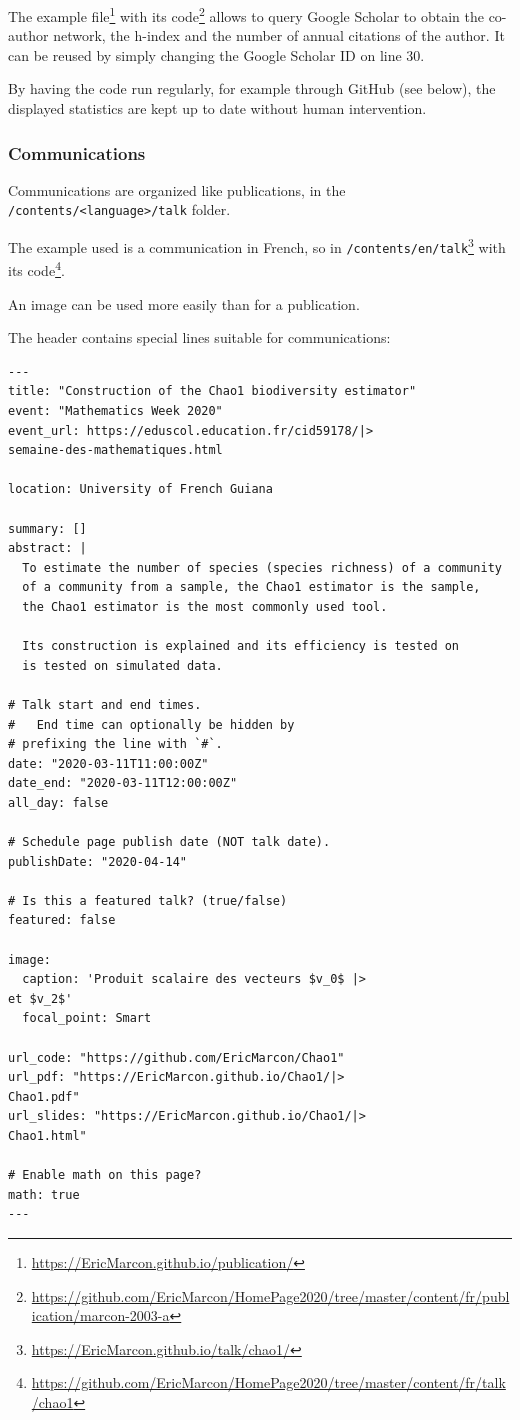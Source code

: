 \documentclass[
  12pt,
  american,
  a4paper,
  extrafontsizes,onecolumn,openright
  ]{memoir}
\begin{document}
The example file\footnote{\url{https://EricMarcon.github.io/publication/}} with its code\footnote{\url{https://github.com/EricMarcon/HomePage2020/tree/master/content/fr/publication/marcon-2003-a}} allows to query Google Scholar to obtain the co-author network, the h-index and the number of annual citations of the author.
It can be reused by simply changing the Google Scholar ID on line 30.

By having the code run regularly, for example through GitHub (see below), the displayed statistics are kept up to date without human intervention.

\subsubsection{Communications}\label{communications}

Communications are organized like publications, in the \texttt{/contents/\textless{}language\textgreater{}}\break\texttt{/talk} folder.

The example used is a communication in French, so in \texttt{/contents/en/talk}\footnote{\url{https://EricMarcon.github.io/talk/chao1/}} with its code\footnote{\url{https://github.com/EricMarcon/HomePage2020/tree/master/content/fr/talk/chao1}}.

An image can be used more easily than for a publication.

The header contains special lines suitable for communications:

\begin{verbatim}
---
title: "Construction of the Chao1 biodiversity estimator"
event: "Mathematics Week 2020"
event_url: https://eduscol.education.fr/cid59178/|>
semaine-des-mathematiques.html

location: University of French Guiana

summary: []
abstract: |
  To estimate the number of species (species richness) of a community 
  of a community from a sample, the Chao1 estimator is the sample, 
  the Chao1 estimator is the most commonly used tool.

  Its construction is explained and its efficiency is tested on
  is tested on simulated data.

# Talk start and end times.
#   End time can optionally be hidden by 
# prefixing the line with `#`.
date: "2020-03-11T11:00:00Z"
date_end: "2020-03-11T12:00:00Z"
all_day: false

# Schedule page publish date (NOT talk date).
publishDate: "2020-04-14"

# Is this a featured talk? (true/false)
featured: false

image:
  caption: 'Produit scalaire des vecteurs $v_0$ |>
et $v_2$'
  focal_point: Smart

url_code: "https://github.com/EricMarcon/Chao1"
url_pdf: "https://EricMarcon.github.io/Chao1/|>
Chao1.pdf"
url_slides: "https://EricMarcon.github.io/Chao1/|>
Chao1.html"

# Enable math on this page?
math: true
---
\end{verbatim}
\end{document}
